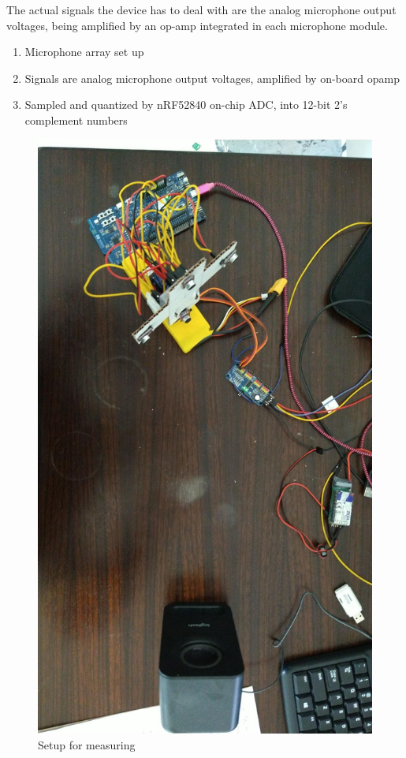 \documentclass[a4paper]{article}
\begin{document}
The actual signals the device has to deal with are the analog microphone output voltages, being amplified by an op-amp integrated in each microphone module. 

\begin{enumerate}
    \item Microphone array set up
    \item Signals are analog microphone output voltages, amplified by on-board opamp
    \item Sampled and quantized by nRF52840 on-chip ADC, into 12-bit 2's complement numbers
\end{enumerate}

\begin{figure}
    \begin{center}
        \includegraphics[angle=90,width=\linewidth]{assets/test_setup.jpeg}
        \caption{Setup for measuring}
        \label{fig:test_setup}
    \end{center}
\end{figure}
\end{document}
